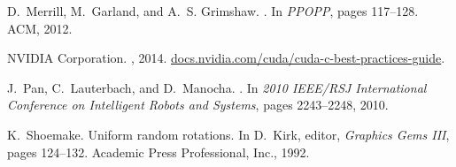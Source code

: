 \documentclass[a4paper]{article}
\begin{document}
\begin{thebibliography}{10}
D.~Merrill, M.~Garland, and A.~S. Grimshaw.
.
\newblock In {\em PPOPP}, pages 117--128. ACM, 2012.

{NVIDIA Corporation}.
, 2014.
\newblock \url{docs.nvidia.com/cuda/cuda-c-best-practices-guide}.

J.~Pan, C.~Lauterbach, and D.~Manocha.
.
\newblock In {\em 2010 {IEEE/RSJ} International Conference on Intelligent
  Robots and Systems}, pages 2243--2248, 2010.

K.~Shoemake.
\newblock Uniform random rotations.
\newblock In D.~Kirk, editor, {\em {Graphics Gems III}}, pages 124--132.
  Academic Press Professional, Inc., 1992.

\end{thebibliography}
\end{document}
